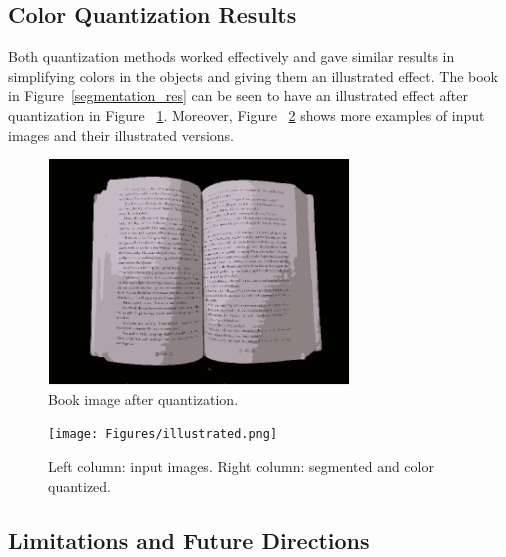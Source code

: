 \documentclass{article}
\begin{document}
\subsection{Color Quantization Results}
\label{sec:quant_results}
Both quantization methods worked effectively and gave similar results in simplifying colors in the objects and giving them an illustrated effect. The book in Figure~\ref{segmentation_res} can be seen to have an illustrated effect after quantization in  Figure ~\ref{quantized_book}. Moreover, Figure ~\ref{quantized} shows more examples of input images and their illustrated versions. 

\begin{figure}[H]
  \begin{minipage}[b]{1.0\linewidth}
    \centering
    \centerline{\includegraphics[width=8.0cm]{Figures/openbook_kmeans_quant.png}}
  \end{minipage}
  \caption{Book image after quantization.}
  \label{quantized_book}
\end{figure}

\begin{figure}[H]
  \begin{minipage}[b]{1.0\linewidth}
    \centering
    \centerline{\texttt{[image: Figures/illustrated.png]}}
  \end{minipage}
  \caption{Left column: input images. Right column: segmented and color quantized.}
  \label{quantized}
\end{figure}

\subsection{Limitations and Future Directions}
\end{document}
